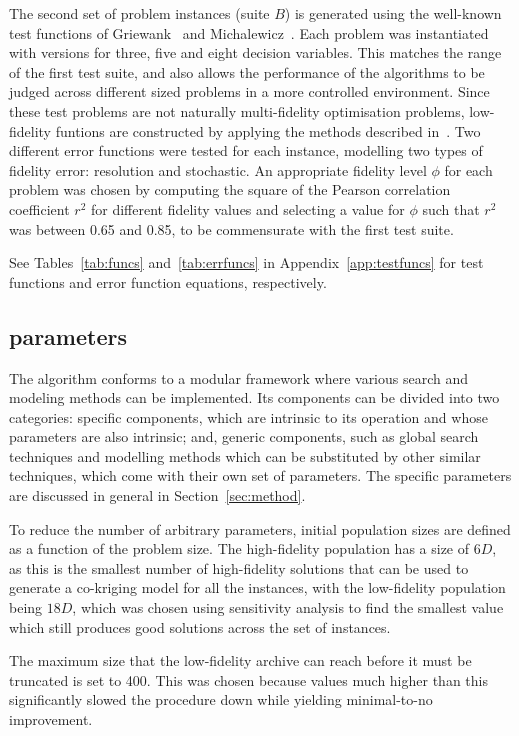 The second set of problem instances (suite $B$) is generated using the well-known test functions of Griewank~\cite{griewank1981generalized} and Michalewicz~\cite{michalewicz2013genetic}. Each problem was instantiated with versions for three, five and eight decision variables. This matches the range of the first test suite, and also allows the performance of the algorithms to be judged across different sized problems in a more controlled environment. Since these test problems are not naturally multi-fidelity optimisation problems, low-fidelity funtions are constructed by applying the methods described in~\cite{wang2017generic}. Two different error functions were tested for each instance, modelling two types of fidelity error: resolution and stochastic. An appropriate fidelity level $\phi$ for each problem was chosen by computing the square of the Pearson correlation coefficient $r^2$ for different fidelity values and selecting a value for $\phi$ such that $r^2$ was between 0.65 and 0.85, to be commensurate with the first test suite.

See Tables~\ref{tab:funcs} and~\ref{tab:errfuncs} in Appendix~\ref{app:testfuncs} for test functions and error function equations, respectively.

\subsection{\AlgName{} parameters}
The \AlgName{} algorithm conforms to a modular framework where various search and modeling methods can be implemented. Its components can be divided into two categories: \AlgName{} specific components, which are intrinsic to its operation and whose parameters are also intrinsic; and, generic components, such as global search techniques and modelling methods which can be substituted by other similar techniques, which come with their own set of parameters. The \AlgName{} specific parameters are discussed in general in Section~\ref{sec:method}.

To reduce the number of arbitrary parameters, initial population sizes are defined as a function of the problem size. The high-fidelity population has a size of $6D$, as this is the smallest number of high-fidelity solutions that can be used to generate a co-kriging model for all the instances, with the low-fidelity population being $18D$, which was chosen using sensitivity analysis to find the smallest value which still produces good solutions across the set of instances.

The maximum size that the low-fidelity archive can reach before it must be truncated is set to 400. This was chosen because values much higher than this significantly slowed the procedure down while yielding minimal-to-no improvement. 

